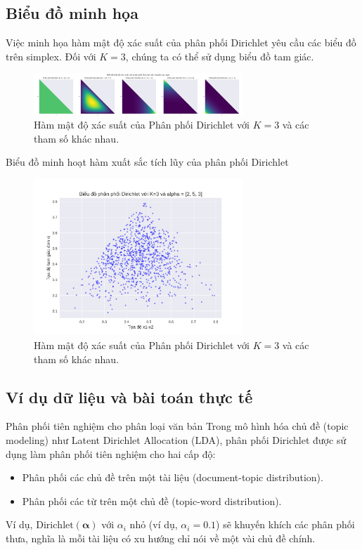 	
	\subsection{Biểu đồ minh họa}
	Việc minh họa hàm	 mật độ xác suất của phân phối Dirichlet yêu cầu các biểu đồ trên simplex. Đối với $K=3$, chúng ta có thể sử dụng biểu đồ tam giác.
	
	\begin{figure}[h!]
		\centering
		\includegraphics[width=0.7\textwidth]{images/Dirichlet Distribution-PDF.png} %
		\caption{Hàm mật độ xác suất của Phân phối Dirichlet với $K=3$ và các tham số khác nhau.}
		\label{fig:pngDirichlet Distribution-PDF}
	\end{figure}
	
	Biểu đồ minh hoạt hàm xuất sắc tích lũy của phân phối Dirichlet
	
	\begin{figure}[h!]
		\centering
		\includegraphics[width=0.7\textwidth]{images/Dirichlet Distribution-CDF.png} %
		\caption{Hàm mật độ xác suất của Phân phối Dirichlet với $K=3$ và các tham số khác nhau.}
		\label{fig:pngDirichlet Distribution-CDF}
	\end{figure}
	
	\subsection{Ví dụ dữ liệu và bài toán thực tế}
		Phân phối tiên nghiệm cho phân loại văn bản
		Trong mô hình hóa chủ đề (topic modeling) như Latent Dirichlet Allocation (LDA), 
		phân phối Dirichlet được sử dụng làm phân phối tiên nghiệm cho hai cấp độ:
		\begin{itemize}
			\item Phân phối các chủ đề trên một tài liệu (document-topic distribution).
			\item Phân phối các từ trên một chủ đề (topic-word distribution).
		\end{itemize}
		Ví dụ, $\text{Dirichlet}(\boldsymbol{\alpha})$ với $\alpha_i$ nhỏ (ví dụ, $\alpha_i=0.1$) sẽ khuyến khích các phân phối thưa, nghĩa là mỗi tài liệu có xu hướng chỉ nói về một vài chủ đề chính.
	
